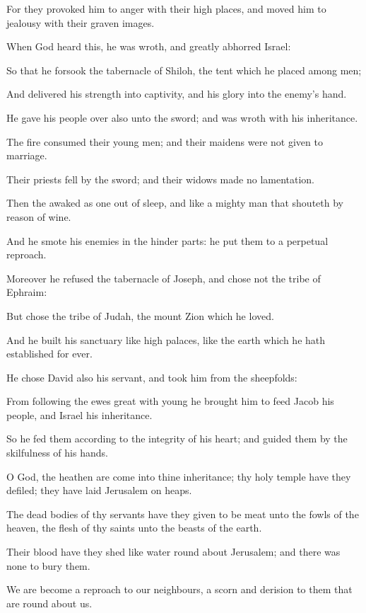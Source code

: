 \Verse For they provoked him to anger with their high places, and moved him to jealousy with their graven images.

\Verse When God heard this, he was wroth, and greatly abhorred Israel:

\Verse So that he forsook the tabernacle of Shiloh, the tent which he placed among men;

\Verse And delivered his strength into captivity, and his glory into the enemy's hand.

\Verse He gave his people over also unto the sword; and was wroth with his inheritance.

\Verse The fire consumed their young men; and their maidens were not given to marriage.

\Verse Their priests fell by the sword; and their widows made no lamentation.

\Verse Then the \LORD awaked as one out of sleep, and like a mighty man that shouteth by reason of wine.

\Verse And he smote his enemies in the hinder parts: he put them to a perpetual reproach.

\Verse Moreover he refused the tabernacle of Joseph, and chose not the tribe of Ephraim:

\Verse But chose the tribe of Judah, the mount Zion which he loved.

\Verse And he built his sanctuary like high palaces, like the earth which he hath established for ever.

\Verse He chose David also his servant, and took him from the sheepfolds:

\Verse From following the ewes great with young he brought him to feed Jacob his people, and Israel his inheritance.

\Verse So he fed them according to the integrity of his heart; and guided them by the skilfulness of his hands.




\Chapter
\Verse O God, the heathen are come into thine inheritance; thy holy temple have they defiled; they have laid Jerusalem on heaps.

\Verse The dead bodies of thy servants have they given to be meat unto the fowls of the heaven, the flesh of thy saints unto the beasts of the earth.

\Verse Their blood have they shed like water round about Jerusalem; and there was none to bury them.

\Verse We are become a reproach to our neighbours, a scorn and derision to them that are round about us.

